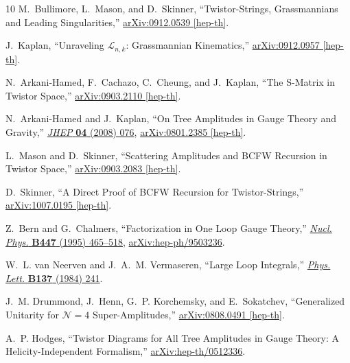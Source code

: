 \documentclass[11pt, reqno]{article}
\begin{document}
\begin{thebibliography}{10}
M.~Bullimore, L.~Mason, and D.~Skinner, ``{Twistor-Strings, Grassmannians and
  Leading Singularities},''
\href{http://arxiv.org/abs/0912.0539}{{ arXiv:0912.0539 [hep-th]}}.

J.~Kaplan, ``{Unraveling $\mathcal{L}_{n,k}$: Grassmannian Kinematics},''
\href{http://arxiv.org/abs/0912.0957}{{ arXiv:0912.0957 [hep-th]}}.

N.~Arkani-Hamed, F.~Cachazo, C.~Cheung, and J.~Kaplan, ``{The S-Matrix in
  Twistor Space},''
\href{http://arxiv.org/abs/0903.2110}{{ arXiv:0903.2110 [hep-th]}}.

N.~Arkani-Hamed and J.~Kaplan, ``{On Tree Amplitudes in Gauge Theory and
  Gravity},'' \href{http://dx.doi.org/10.1088/1126-6708/2008/04/076}{{\em JHEP}
  {\bf 04} (2008)  076},
\href{http://arxiv.org/abs/0801.2385}{{ arXiv:0801.2385 [hep-th]}}.

L.~Mason and D.~Skinner, ``{Scattering Amplitudes and BCFW Recursion in Twistor
  Space},''
\href{http://arxiv.org/abs/0903.2083}{{ arXiv:0903.2083 [hep-th]}}.

D.~Skinner, ``{A Direct Proof of BCFW Recursion for Twistor-Strings},''
\href{http://arxiv.org/abs/1007.0195}{{ arXiv:1007.0195 [hep-th]}}.

Z.~Bern and G.~Chalmers, ``{Factorization in One Loop Gauge Theory},''
  \href{http://dx.doi.org/10.1016/0550-3213(95)00226-I}{{\em Nucl. Phys.} {\bf
  B447} (1995)  465--518},
\href{http://arxiv.org/abs/hep-ph/9503236}{{ arXiv:hep-ph/9503236}}.

W.~L. van Neerven and J.~A.~M. Vermaseren, ``{Large Loop Integrals},''
\href{http://dx.doi.org/10.1016/0370-2693(84)90237-5}{{\em Phys. Lett.} {\bf
  B137} (1984)  241}.

J.~M. Drummond, J.~Henn, G.~P. Korchemsky, and E.~Sokatchev, ``{Generalized
  Unitarity for $\mathcal{N}=4$ Super-Amplitudes},''
\href{http://arxiv.org/abs/0808.0491}{{ arXiv:0808.0491 [hep-th]}}.

A.~P. Hodges, ``{Twistor Diagrams for All Tree Amplitudes in Gauge Theory: A
  Helicity-Independent Formalism},''
\href{http://arxiv.org/abs/hep-th/0512336}{{ arXiv:hep-th/0512336}}.


\end{thebibliography}
\end{document}
